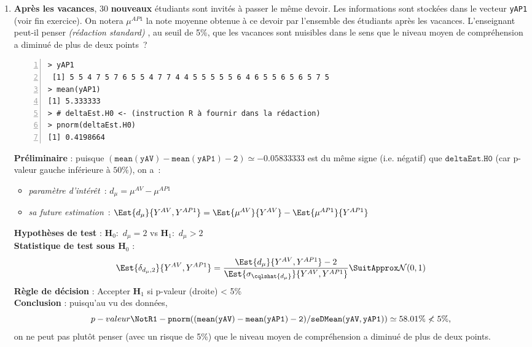 \documentclass[10pt]{report}
\newcommand{\redstd}{\textit{(rédaction standard) }}
\begin{document}
\begin{exercice}
\begin{enumerate}
\item  
\textbf{Après les vacances}, 30 \textbf{nouveaux} étudiants sont invités à passer le même devoir. Les informations sont stockées dans le vecteur \texttt{yAP1} (voir fin exercice). On notera $\mu^{AP1}$ la note moyenne obtenue à ce devoir par l'ensemble des étudiants après les vacances. L'enseignant peut-il penser \redstd, au seuil de 5\%, que les vacances sont nuisibles dans le sens que le niveau moyen de compréhension a diminué de plus de deux points~?

\IndicR
\begin{Verbatim}[frame=leftline,fontfamily=tt,fontshape=n,numbers=left]
> yAP1
 [1] 5 5 4 7 5 7 6 5 5 4 7 7 4 4 5 5 5 5 5 6 4 6 5 5 6 5 6 5 7 5
> mean(yAP1)
[1] 5.333333
> # deltaEst.H0 <- (instruction R à fournir dans la rédaction)
> pnorm(deltaEst.H0)
[1] 0.4198664
\end{Verbatim}

 

\begin{Correction}
\noindent \textbf{Préliminaire} : puisque $\mathtt{(mean(yAV)-mean(yAP1)-2)}\simeq-0.05833333$ est du même signe (i.e. négatif) que $\mathtt{deltaEst.H0}$ (car p-valeur gauche inférieure à $50\%$), on a~: 
      \begin{itemize}
\item \textit{paramètre d'intérêt}~: $d_\mu=\mu^{AV}-\mu^{AP1}$
\item \textit{sa future estimation}~: $\Est{d_\mu}{Y^{AV},Y^{AP1}}=\Est{\mu^{AV}}{Y^{AV}}-\Est{\mu^{AP1}}{Y^{AP1}}$
\end{itemize}
\noindent \textbf{Hypothèses de test} : $\mathbf{H}_0:$ $d_\mu=2$ vs {\large $\mathbf{H}_1:$ $d_\mu>2$}\\
\textbf{Statistique de test sous $\mathbf{H}_0$} :
  $$
  \Est{\delta_{d_\mu,2}}{Y^{AV},Y^{AP1}}= {\displaystyle \frac{\Est{d_\mu}{Y^{AV},Y^{AP1}}-2}{
\Est{\sigma_{\cqlshat{d_\mu}}}{Y^{AV},Y^{AP1}}
}} 
  \SuitApprox \mathcal{N}(0,1)
  $$
\textbf{Règle de décision} : Accepter $\mathbf{H}_1$ si 
  p-valeur (droite) < 5\%\\
\noindent \textbf{Conclusion} :
puisqu'au vu des données, 
  \[
p-valeur\NotR\mathtt{1-pnorm((mean(yAV)-mean(yAP1)-2)/seDMean(yAV,yAP1))} \simeq 58.01\%\nless5\%,
\]
on ne peut pas plutôt penser (avec un risque de 5\%) que le niveau moyen de compréhension a diminué de plus de deux points.
\end{Correction}







\end{enumerate}
\end{exercice}
\end{document}
